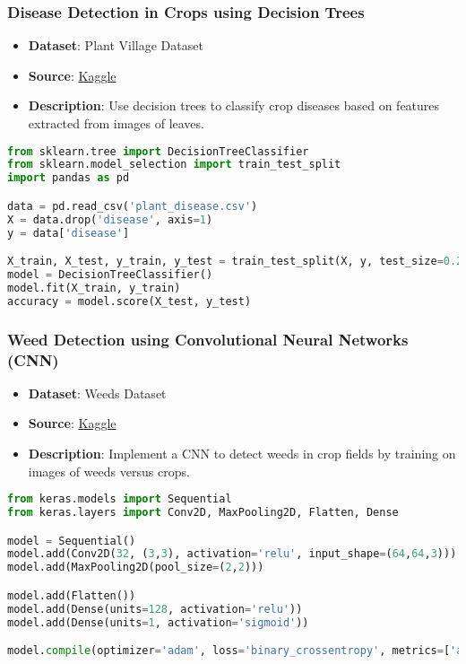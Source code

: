 \begin{frame}[fragile]\frametitle{Disease Detection in Crops using Decision Trees}
    \begin{itemize}
        \item \textbf{Dataset}: Plant Village Dataset
        \item \textbf{Source}: \href{https://www.kaggle.com/datasets/emmarex/plantdisease}{Kaggle}
        \item \textbf{Description}: Use decision trees to classify crop diseases based on features extracted from images of leaves.
    \end{itemize}
    \begin{lstlisting}[language=Python]
from sklearn.tree import DecisionTreeClassifier
from sklearn.model_selection import train_test_split
import pandas as pd

data = pd.read_csv('plant_disease.csv')
X = data.drop('disease', axis=1)
y = data['disease']

X_train, X_test, y_train, y_test = train_test_split(X, y, test_size=0.2)
model = DecisionTreeClassifier()
model.fit(X_train, y_train)
accuracy = model.score(X_test, y_test)
    \end{lstlisting}
\end{frame}

\begin{frame}[fragile]\frametitle{Weed Detection using Convolutional Neural Networks (CNN)}
    \begin{itemize}
        \item \textbf{Dataset}: Weeds Dataset
        \item \textbf{Source}: \href{https://www.kaggle.com/datasets/abhishek/weed-detection-dataset}{Kaggle}
        \item \textbf{Description}: Implement a CNN to detect weeds in crop fields by training on images of weeds versus crops.
    \end{itemize}
    \begin{lstlisting}[language=Python]
from keras.models import Sequential
from keras.layers import Conv2D, MaxPooling2D, Flatten, Dense

model = Sequential()
model.add(Conv2D(32, (3,3), activation='relu', input_shape=(64,64,3)))
model.add(MaxPooling2D(pool_size=(2,2)))

model.add(Flatten())
model.add(Dense(units=128, activation='relu'))
model.add(Dense(units=1, activation='sigmoid'))

model.compile(optimizer='adam', loss='binary_crossentropy', metrics=['accuracy'])
    \end{lstlisting}
\end{frame}

